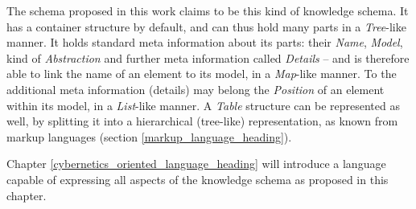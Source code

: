 The schema proposed in this work claims to be this kind of knowledge schema. It
has a container structure by default, and can thus hold many parts in a
\emph{Tree}-like manner. It holds standard meta information about its parts:
their \emph{Name}, \emph{Model}, kind of \emph{Abstraction} and further meta
information called \emph{Details} -- and is therefore able to link the name of
an element to its model, in a \emph{Map}-like manner. To the additional meta
information (details) may belong the \emph{Position} of an element within its
model, in a \emph{List}-like manner. A \emph{Table} structure can be represented
as well, by splitting it into a hierarchical (tree-like) representation, as
known from markup languages (section \ref{markup_language_heading}).

Chapter \ref{cybernetics_oriented_language_heading} will introduce a language
capable of expressing all aspects of the knowledge schema as proposed in this
chapter.
